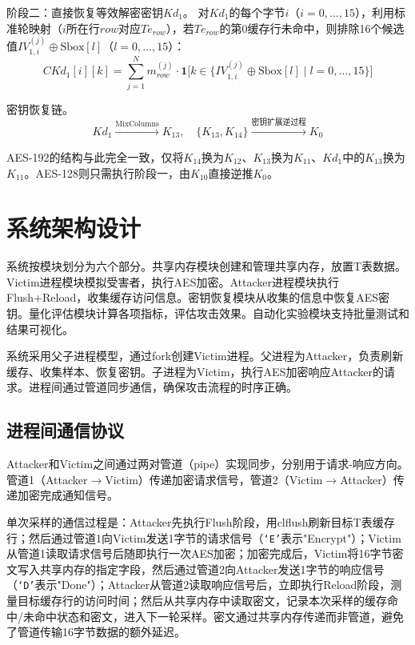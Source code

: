 阶段二：直接恢复等效解密密钥$Kd_1$。
对$Kd_1$的每个字节$i$（$i = 0,\dots,15$），利用标准轮映射（$i$所在行$row$对应$Te_{row}$），若$Te_{row}$的第0缓存行未命中，则排除16个候选值$IV_{1,i}^{(j)} \oplus \text{Sbox}[l]$（$l = 0,\dots,15$）：
\begin{equation}
CKd_1[i][k] = \sum_{j=1}^{N} m_{row}^{(j)} \cdot \mathbf{1}\bigl[k \in \{IV_{1,i}^{(j)} \oplus \text{Sbox}[l] \mid l = 0,\dots,15\}\bigr]
\end{equation}

密钥恢复链。
\begin{equation}
Kd_1 \xrightarrow{\text{MixColumns}} K_{13}, \quad
\{K_{13}, K_{14}\} \xrightarrow{\text{密钥扩展逆过程}} K_0
\end{equation}

AES-192的结构与此完全一致，仅将$K_{14}$换为$K_{12}$、$K_{13}$换为$K_{11}$、$Kd_1$中的$K_{13}$换为$K_{11}$。AES-128则只需执行阶段一，由$K_{10}$直接逆推$K_0$。

\section{系统架构设计}

系统按模块划分为六个部分。共享内存模块创建和管理共享内存，放置T表数据。Victim进程模块模拟受害者，执行AES加密。Attacker进程模块执行Flush+Reload，收集缓存访问信息。密钥恢复模块从收集的信息中恢复AES密钥。量化评估模块计算各项指标，评估攻击效果。自动化实验模块支持批量测试和结果可视化。

系统采用父子进程模型，通过fork创建Victim进程。父进程为Attacker，负责刷新缓存、收集样本、恢复密钥。子进程为Victim，执行AES加密响应Attacker的请求。进程间通过管道同步通信，确保攻击流程的时序正确。

\subsection{进程间通信协议}

Attacker和Victim之间通过两对管道（pipe）实现同步，分别用于请求-响应方向。管道1（Attacker$\rightarrow$Victim）传递加密请求信号，管道2（Victim$\rightarrow$Attacker）传递加密完成通知信号。

单次采样的通信过程是：Attacker先执行Flush阶段，用clflush刷新目标T表缓存行；然后通过管道1向Victim发送1字节的请求信号（\texttt{`E'}表示"Encrypt"）；Victim从管道1读取请求信号后随即执行一次AES加密；加密完成后，Victim将16字节密文写入共享内存的指定字段，然后通过管道2向Attacker发送1字节的响应信号（\texttt{`D'}表示"Done"）；Attacker从管道2读取响应信号后，立即执行Reload阶段，测量目标缓存行的访问时间；然后从共享内存中读取密文，记录本次采样的缓存命中/未命中状态和密文，进入下一轮采样。密文通过共享内存传递而非管道，避免了管道传输16字节数据的额外延迟。

